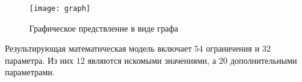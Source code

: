 \begin{figure}[H]
  \centering
  \texttt{[image: graph]}
  \caption{Графическое предствление в виде графа}
  \label{fig:graph}
\end{figure}


Результирующая математическая модель включает $54$ ограничения и $32$ параметра. Из них $12$ являются искомыми значениями, а $20$ дополнительными параметрами.


